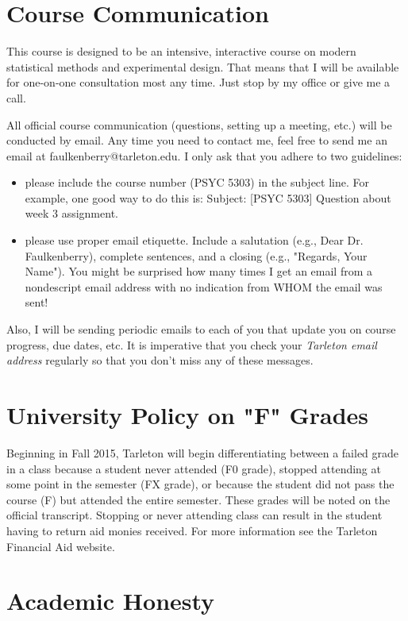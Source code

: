 \documentclass[10pt]{article}
\begin{document}
\section*{Course Communication}
\label{sec:org784ecf8}

This course is designed to be an intensive, interactive course on modern statistical methods and experimental design.  That means that I will be available for one-on-one consultation most any time.  Just stop by my office or give me a call.

All official course communication (questions, setting up a meeting, etc.) will be conducted by email.  Any time you need to contact me, feel free to send me an email at faulkenberry@tarleton.edu.  I only ask that you adhere to two guidelines:
\begin{itemize}
\item please include the course number (PSYC 5303) in the subject line.  For example, one good way to do this is:  Subject: [PSYC 5303] Question about week 3 assignment.
\item please use proper email etiquette.  Include a salutation (e.g., Dear Dr. Faulkenberry), complete sentences, and a closing (e.g., "Regards, Your Name").  You might be surprised how many times I get an email from a nondescript email address with no indication from WHOM the email was sent!
\end{itemize}

Also, I will be sending periodic emails to each of you that update you on course progress, due dates, etc.  It is imperative that you check your \emph{Tarleton email address} regularly so that you don't miss any of these messages.

\section*{University Policy on "F" Grades}
\label{sec:org772caa6}
Beginning in Fall 2015, Tarleton will begin differentiating between a failed grade in a class because a student never attended (F0 grade), stopped attending at some point in the semester (FX grade), or because the student did not pass the course (F) but attended the entire semester. These grades will be noted on the official transcript. Stopping or never attending class can result in the student having to return aid monies received.  For more information see the Tarleton Financial Aid website.

\section*{Academic Honesty}
\label{sec:org83ae895}
\end{document}
